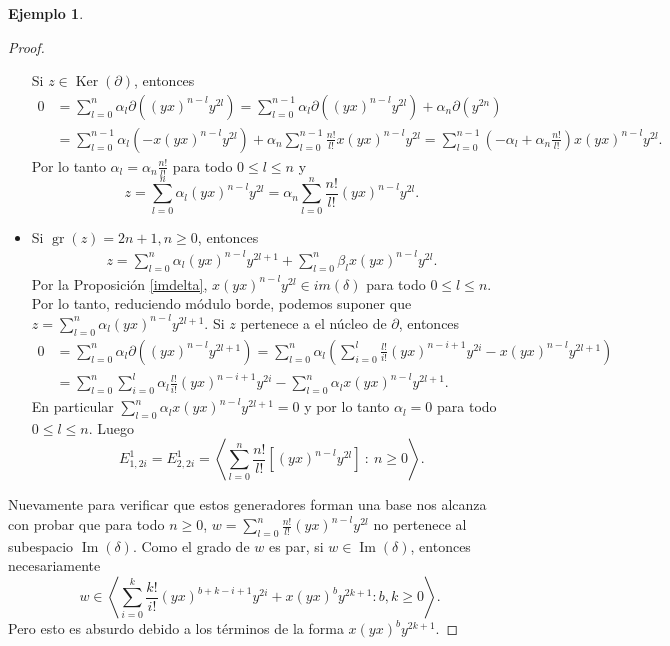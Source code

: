 \documentclass[a4paper,oneside,fleqn,11pt]{report}
\theoremstyle{definition}
\theoremstyle{definition}
\newtheorem{example}{Ejemplo}[section]
\numberwithin{prop}{subsection}
\DeclareMathOperator\Ima{Im}
\DeclareMathOperator\Ker{Ker}
\DeclareMathOperator\gr{gr}
\begin{document}
\begin{example}
\begin{proof}
\begin{itemize}
		Si $z \in \Ker(\partial)$, entonces
		\begin{align*}
			0 &= \sum_{l = 0}^n\alpha_l\partial((yx)^{n - l}y^{2l})
				= \sum_{l = 0}^{n - 1}\alpha_l\partial((yx)^{n - l}y^{2l}) + \alpha_n\partial(y^{2n})\\
			&= \sum_{l = 0}^{n - 1}\alpha_l(-x(yx)^{n - l}y^{2l}) + \alpha_n\sum_{l = 0}^{n - 1}\frac{n!}{l!}x(yx)^{n - l}y^{2l}
				= \sum_{l = 0}^{n - 1}(-\alpha_l + \alpha_n\frac{n!}{l!})x(yx)^{n - l}y^{2l}.
		\end{align*}
		Por lo tanto $\alpha_l = \alpha_n\frac{n!}{l!}$ para todo $0 \leq l \leq n$ y
		\[
			z = 	\sum_{l = 0}^n\alpha_l(yx)^{n - l}y^{2l} = \alpha_n\sum_{l = 0}^n\frac{n!}{l!}(yx)^{n - l}y^{2l}.
		\]
		\item Si $\gr(z) = 2n + 1, n \geq 0$, entonces
		\begin{align*}
			z = \sum_{l = 0}^n\alpha_l(yx)^{n - l}y^{2l + 1} + \sum_{l = 0}^n\beta_lx(yx)^{n - l}y^{2l}.
		\end{align*}
		Por la Proposición \ref{imdelta}, $x(yx)^{n - l}y^{2l} \in im(\delta)$ para todo $0 \leq l \leq n$.
		Por lo tanto, reduciendo módulo borde, podemos suponer que $z = \sum_{l = 0}^n\alpha_l(yx)^{n - l}y^{2l + 1}$.
		Si $z$ pertenece a el núcleo de $\partial$, entonces
		\begin{align*}
			0 &= \sum_{l = 0}^n\alpha_l\partial((yx)^{n - l}y^{2l + 1})
				= \sum_{l = 0}^n\alpha_l\left(\sum_{i = 0}^l\frac{l!}{i!}(yx)^{n - i + 1}y^{2i} -x(yx)^{n - l}y^{2l + 1}\right)\\
			&= \sum_{l = 0}^n\sum_{i = 0}^l\alpha_l\frac{l!}{i!}(yx)^{n - i + 1}y^{2i} - \sum_{l = 0}^n\alpha_lx(yx)^{n - l}y^{2l + 1}.
		\end{align*}
		En particular $\sum_{l = 0}^n\alpha_lx(yx)^{n - l}y^{2l + 1} = 0$ y por lo tanto $\alpha_l = 0$ para todo $0 \leq l \leq n$.
		Luego
		\[
			E_{1,2i}^1 = E_{2, 2i}^1 = \left\langle \sum_{l = 0}^n \frac{n!}{l!}\left[(yx)^{n - l}y^{2l}\right] \ :\ n \geq 0\right\rangle.
		\]
	\end{itemize}
	Nuevamente para verificar que estos generadores forman una base nos alcanza con probar que para  todo $n \geq 0$,
	$w = \sum_{l = 0}^n \frac{n!}{l!}(yx)^{n - l}y^{2l}$ no pertenece al subespacio $\Ima(\delta)$.
	Como el grado de $w$ es par, si $w \in \Ima(\delta)$, entonces necesariamente
	\[
		w \in \left\langle \sum_{i = 0}^k\frac{k!}{i!}(yx)^{b + k - i + 1}y^{2i} + x(yx)^by^{2k + 1} : b,k \geq 0 \right\rangle.
	\]
	Pero esto es absurdo debido a los términos de la forma $x(yx)^by^{2k + 1}$.
\end{proof}


\end{example}
\end{document}
